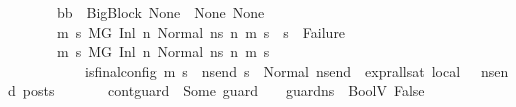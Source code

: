 \begin{isabellebody}
\ \ \ \ \ \ \ {\isachardoublequoteopen}bb\ {\isacharequal}{\kern0pt}\ BigBlock\ None\ {\isacharbrackleft}{\kern0pt}{\isacharbrackright}{\kern0pt}\ None\ None{\isachardoublequoteclose}\isanewline
\ \ \ \ \ \ \ {\isachardoublequoteopen}{\isasymAnd}m{}\ s{}{\isachardot}{\kern0pt}\ {\isacharparenleft}{\kern0pt}M{\isacharcomma}{\kern0pt}{\isasymLambda}{\isacharcomma}{\kern0pt}{\isasymGamma}{\isacharcomma}{\kern0pt}{\isasymOmega}{\isacharcomma}{\kern0pt}G\ {\isasymturnstile}{\isacharparenleft}{\kern0pt}Inl\ n{\isacharcomma}{\kern0pt}\ Normal\ ns{}{\isacharprime}{\kern0pt}{\isacharprime}{\kern0pt}{\isacharparenright}{\kern0pt}\ {\isacharminus}{\kern0pt}n{\isasymrightarrow}{\isacharasterisk}{\kern0pt}\ {\isacharparenleft}{\kern0pt}m{}{\isacharcomma}{\kern0pt}\ s{}{\isacharparenright}{\kern0pt}{\isacharparenright}{\kern0pt}\ {\isasymLongrightarrow}\ s{}\ {\isasymnoteq}\ Failure{\isachardoublequoteclose}\isanewline
\ \ \ \ \ \ \ {\isachardoublequoteopen}{\isasymAnd}m{\isacharprime}{\kern0pt}\ s{\isacharprime}{\kern0pt}{\isachardot}{\kern0pt}\ {\isacharparenleft}{\kern0pt}M{\isacharcomma}{\kern0pt}{\isasymLambda}{\isacharcomma}{\kern0pt}{\isasymGamma}{\isacharcomma}{\kern0pt}{\isasymOmega}{\isacharcomma}{\kern0pt}G\ {\isasymturnstile}{\isacharparenleft}{\kern0pt}Inl\ n{\isacharcomma}{\kern0pt}\ Normal\ ns{}{\isacharprime}{\kern0pt}{\isacharprime}{\kern0pt}{\isacharparenright}{\kern0pt}\ {\isacharminus}{\kern0pt}n{\isasymrightarrow}{\isacharasterisk}{\kern0pt}\ {\isacharparenleft}{\kern0pt}m{\isacharprime}{\kern0pt}{\isacharcomma}{\kern0pt}\ s{\isacharprime}{\kern0pt}{\isacharparenright}{\kern0pt}{\isacharparenright}{\kern0pt}\ {\isasymLongrightarrow}\isanewline
\ \ \ \ \ \ \ \ \ \ \ is{\isacharunderscore}{\kern0pt}final{\isacharunderscore}{\kern0pt}config\ {\isacharparenleft}{\kern0pt}m{\isacharprime}{\kern0pt}{\isacharcomma}{\kern0pt}\ s{\isacharprime}{\kern0pt}{\isacharparenright}{\kern0pt}\ {\isasymLongrightarrow}\ {\isasymforall}ns{\isacharunderscore}{\kern0pt}end{\isachardot}{\kern0pt}\ s{\isacharprime}{\kern0pt}\ {\isacharequal}{\kern0pt}\ Normal\ ns{\isacharunderscore}{\kern0pt}end\ {\isasymlongrightarrow}\ {\isacharparenleft}{\kern0pt}expr{\isacharunderscore}{\kern0pt}all{\isacharunderscore}{\kern0pt}sat\ {\isasymLambda}{}{\isacharunderscore}{\kern0pt}local\ {\isasymGamma}\ {\isasymOmega}\ ns{\isacharunderscore}{\kern0pt}end{\isacharparenright}{\kern0pt}\ posts{\isachardoublequoteclose}\isanewline
\ \ \ \ \ \ \ {\isachardoublequoteopen}{\isacharparenleft}{\kern0pt}cont{\isacharunderscore}{\kern0pt}guard\ {\isacharequal}{\kern0pt}\ Some\ guard{\isacharparenright}{\kern0pt}\ {\isasymLongrightarrow}\ {\isacharparenleft}{\kern0pt}{\isasymLambda}{\isacharcomma}{\kern0pt}{\isasymGamma}{\isacharcomma}{\kern0pt}{\isasymOmega}\ {\isasymturnstile}\ {\isasymlangle}guard{\isacharcomma}{\kern0pt}ns{}{\isacharprime}{\kern0pt}{\isacharprime}{\kern0pt}{\isasymrangle}\ {\isasymDown}\ BoolV\ False{\isacharparenright}{\kern0pt}{\isachardoublequoteclose}\isanewline

\end{isabellebody}
